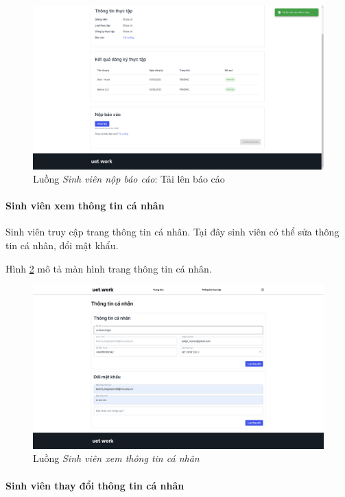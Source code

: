\documentclass[./../main.tex]{subfiles}
\begin{document}
\begin{figure}[]
	\includegraphics[width=\linewidth]{./images/image43.png}
	\caption{Luồng \emph{Sinh viên nộp báo cáo}: Tải lên báo cáo}
	\label{fig:student_upload_report}
\end{figure}

\paragraph*{Sinh viên xem thông tin cá nhân}
Sinh viên truy cập trang thông tin cá nhân. Tại đây sinh viên có thể sửa thông tin cá nhân, đổi mật khẩu.

Hình \ref{fig:view_info_page} mô tả màn hình trang thông tin cá nhân.

\begin{figure}[]
	\includegraphics[width=\linewidth]{./images/image44.png}
	\caption{Luồng \emph{Sinh viên xem thông tin cá nhân}}
	\label{fig:view_info_page}
\end{figure}

\paragraph*{Sinh viên thay đổi thông tin cá nhân}
\end{document}
